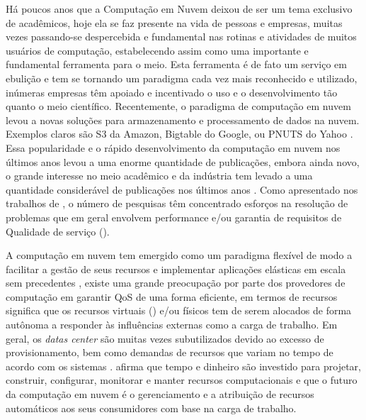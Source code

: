 Há poucos anos que a Computação em Nuvem deixou de ser um tema exclusivo de acadêmicos, hoje ela se faz presente na vida de pessoas e empresas, muitas vezes passando-se despercebida e fundamental nas rotinas e atividades de muitos usuários de computação, estabelecendo assim como uma importante e fundamental ferramenta para o meio. Esta ferramenta é de fato um serviço em ebulição e tem se tornando um paradigma cada vez mais reconhecido e utilizado, inúmeras empresas têm apoiado e incentivado o uso e o desenvolvimento tão quanto o meio científico. Recentemente, o paradigma de computação em nuvem levou a novas soluções para armazenamento e processamento de dados na nuvem. Exemplos claros são S3 da Amazon, Bigtable do Google, ou PNUTS do Yahoo \cite{Binnig2009}. Essa popularidade e o rápido desenvolvimento da computação em nuvem nos últimos anos levou a uma enorme quantidade de publicações, embora ainda novo, o grande interesse no meio acadêmico e da indústria tem levado a uma quantidade considerável de publicações nos últimos anos \cite{Heilig2014}.
Como apresentado nos trabalhos de \cite{Heilig2014, Yang2012}, o  número de pesquisas têm concentrado esforços na resolução de problemas que em geral envolvem performance e/ou garantia de requisitos de Qualidade de serviço (\textit{}). 

A computação em nuvem tem emergido como um paradigma flexível de modo a facilitar a gestão de seus recursos e implementar aplicações elásticas em escala sem precedentes \cite{Cervino2012}, existe uma grande preocupação por parte dos provedores de computação em garantir QoS de uma forma eficiente, em termos de recursos significa que os recursos virtuais (\textit{}) e/ou físicos tem de serem alocados de forma autônoma a responder às influências externas como a carga de trabalho. Em geral, os \textit{datas center} são muitas vezes subutilizados devido ao excesso de provisionamento, bem como demandas de recursos que variam no tempo de acordo com os sistemas \cite{Padala2007}. \cite{Inomata2011} afirma que tempo e dinheiro são investido para projetar, construir, configurar, monitorar e manter recursos computacionais e que o futuro da computação em nuvem é o gerenciamento e a atribuição de recursos automáticos aos seus consumidores com base na carga de trabalho.


